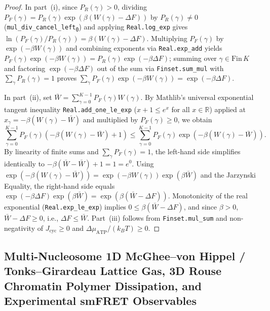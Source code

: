 \documentclass[11pt,a4paper]{article}
\theoremstyle{definition}
\begin{document}
\begin{proof}
In part~(i), since $P_R(\gamma) > 0$, dividing $P_F(\gamma) = P_R(\gamma)\exp(\beta(W(\gamma)-\Delta F))$ by $P_R(\gamma) \ne 0$ (\texttt{mul\_div\_cancel\_left\textsubscript{0}}) and applying \texttt{Real.log\_exp} gives $\ln(P_F(\gamma)/P_R(\gamma)) = \beta(W(\gamma)-\Delta F)$. Multiplying $P_F(\gamma)$ by $\exp(-\beta W(\gamma))$ and combining exponents via \texttt{Real.exp\_add} yields $P_F(\gamma)\exp(-\beta W(\gamma)) = P_R(\gamma)\exp(-\beta\Delta F)$; summing over $\gamma \in \mathrm{Fin}\,K$ and factoring $\exp(-\beta\Delta F)$ out of the sum via \texttt{Finset.sum\_mul} with $\sum_\gamma P_R(\gamma) = 1$ proves $\sum_\gamma P_F(\gamma)\exp(-\beta W(\gamma)) = \exp(-\beta\Delta F)$.

In part~(ii), set $\bar{W} = \sum_{\gamma=0}^{K-1} P_F(\gamma) W(\gamma)$. By Mathlib's universal exponential tangent inequality \texttt{Real.add\_one\_le\_exp} ($x + 1 \le e^x$ for all $x \in \mathbb{R}$) applied at $x_\gamma = -\beta(W(\gamma) - \bar{W})$ and multiplied by $P_F(\gamma) \ge 0$, we obtain
\[
  \sum_{\gamma=0}^{K-1} P_F(\gamma)\left(-\beta(W(\gamma) - \bar{W}) + 1\right) \le \sum_{\gamma=0}^{K-1} P_F(\gamma)\exp\!\left(-\beta(W(\gamma) - \bar{W})\right).
\]
By linearity of finite sums and $\sum_\gamma P_F(\gamma) = 1$, the left-hand side simplifies identically to $-\beta(\bar{W} - \bar{W}) + 1 = 1 = e^0$. Using $\exp(-\beta(W(\gamma)-\bar{W})) = \exp(-\beta W(\gamma))\exp(\beta\bar{W})$ and the Jarzynski Equality, the right-hand side equals $\exp(-\beta\Delta F)\exp(\beta\bar{W}) = \exp(\beta(\bar{W}-\Delta F))$. Monotonicity of the real exponential (\texttt{Real.exp\_le\_exp}) implies $0 \le \beta(\bar{W}-\Delta F)$, and since $\beta > 0$, $\bar{W} - \Delta F \ge 0$, i.e., $\Delta F \le \bar{W}$. Part~(iii) follows from \texttt{Finset.mul\_sum} and non-negativity of $J_{\mathrm{cyc}} \ge 0$ and $\Delta\mu_{\mathrm{ATP}}/(k_B T) \ge 0$.
\end{proof}

\subsection{Multi-Nucleosome 1D McGhee--von Hippel / Tonks--Girardeau Lattice Gas, 3D Rouse Chromatin Polymer Dissipation, and Experimental smFRET Observables}
\end{document}

